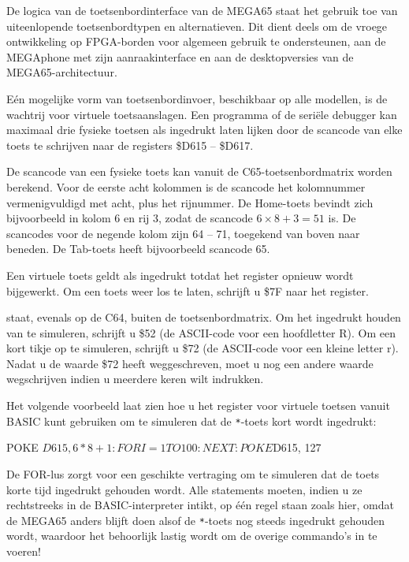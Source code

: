De logica van de toetsenbordinterface van de MEGA65 staat het gebruik toe van uiteenlopende toetsenbordtypen en alternatieven. Dit dient deels om de vroege ontwikkeling op FPGA-borden voor algemeen gebruik te ondersteunen, aan de MEGAphone met zijn aanraakinterface en aan de desktopversies van de MEGA65-architectuur.

Eén mogelijke vorm van toetsenbordinvoer, beschikbaar op alle modellen, is de wachtrij voor virtuele toetsaanslagen. Een programma of de seriële debugger kan maximaal drie fysieke toetsen als ingedrukt laten lijken door de scancode van elke toets te schrijven naar de registers \$D615 -- \$D617.

De scancode van een fysieke toets kan vanuit de C65-toetsenbordmatrix worden berekend. Voor de eerste acht kolommen is de scancode het kolomnummer vermenigvuldigd met acht, plus het rijnummer. De Home-toets bevindt zich bijvoorbeeld in kolom 6 en rij 3, zodat de scancode $6 \times 8 + 3 = 51$ is. De scancodes voor de negende kolom zijn 64 -- 71, toegekend van boven naar beneden. De Tab-toets heeft bijvoorbeeld scancode 65.

Een virtuele toets geldt als ingedrukt totdat het register opnieuw wordt bijgewerkt. Om een toets weer los te laten, schrijft u \$7F naar het register.

 staat, evenals op de C64, buiten de toetsenbordmatrix. Om het ingedrukt houden van  te simuleren, schrijft u \$52 (de ASCII-code voor een hoofdletter R). Om een kort tikje op  te simuleren, schrijft u \$72 (de ASCII-code voor een kleine letter r). Nadat u de waarde \$72 heeft weggeschreven, moet u nog een andere waarde wegschrijven indien u  meerdere keren wilt indrukken.

Het volgende voorbeeld laat zien hoe u het register voor virtuele toetsen vanuit BASIC kunt gebruiken om te simuleren dat de \texttt{*}-toets kort wordt ingedrukt:

\begin{basiccode}
POKE $D615, 6*8+1:FOR I = 1 TO 100:NEXT:POKE $D615, 127
\end{basiccode}

De FOR-lus zorgt voor een geschikte vertraging om te simuleren dat de toets korte tijd ingedrukt gehouden wordt. Alle statements moeten, indien u ze rechtstreeks in de BASIC-interpreter intikt, op één regel staan zoals hier, omdat de MEGA65 anders blijft doen alsof de \texttt{*}-toets nog steeds ingedrukt gehouden wordt, waardoor het behoorlijk lastig wordt om de overige commando's in te voeren!

